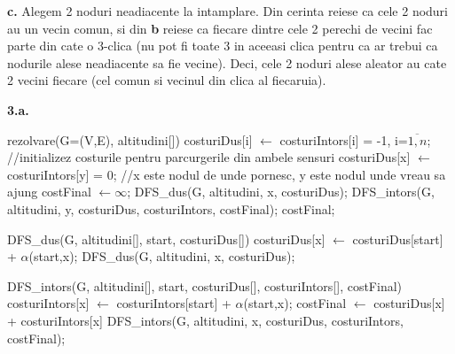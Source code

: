 \documentclass{article}
\begin{document}
{\bf c.} Alegem 2 noduri neadiacente la intamplare. Din cerinta reiese ca cele 2 noduri au un vecin comun, si din {\bf b} reiese ca fiecare dintre cele 2 perechi de vecini fac parte din cate o 3-clica (nu pot fi toate 3 in aceeasi clica pentru ca ar trebui ca nodurile alese neadiacente sa fie vecine). Deci, cele 2 noduri alese aleator au cate 2 vecini fiecare (cel comun si vecinul din clica al fiecaruia).

{\bf 3.}{\bf a.}
\begin{algorithmic}
\STATE rezolvare(G=(V,E), altitudini[])
\vspace{0.1cm}
\STATE costuriDus[i] $\gets$ costuriIntors[i] = -1, i=$\overline{1, n}$; //initializez costurile pentru parcurgerile din ambele sensuri
\STATE costuriDus[x] $\gets$ costuriIntors[y] = 0; //x este nodul de unde pornesc, y este nodul unde vreau sa ajung
\STATE costFinal $\gets \infty$;
\STATE DFS\_dus(G, altitudini, x, costuriDus);
\STATE DFS\_intors(G, altitudini, y, costuriDus, costuriIntors, costFinal);
\RETURN costFinal;

\vspace{0.8cm}

\STATE DFS\_dus(G, altitudini[], start, costuriDus[])
\vspace{0.1cm}
    \STATE costuriDus[x] $\gets$ costuriDus[start] + $\alpha$(start,x);
    \STATE DFS\_dus(G, altitudini, x, costuriDus);
    \ENDIF
\ENDFOR

\vspace{0.8cm}

\STATE DFS\_intors(G, altitudini[], start, costuriDus[], costuriIntors[], costFinal)
\vspace{0.1cm}
        \STATE costuriIntors[x] $\gets$ costuriIntors[start] + $\alpha$(start,x);
            \STATE costFinal $\gets$ costuriDus[x] + costuriIntors[x]
            \ENDIF
        \ENDIF
        \STATE DFS\_intors(G, altitudini, x, costuriDus, costuriIntors, costFinal);
    \ENDIF
\ENDFOR
\end{algorithmic}
\vspace{1cm}
\end{document}
